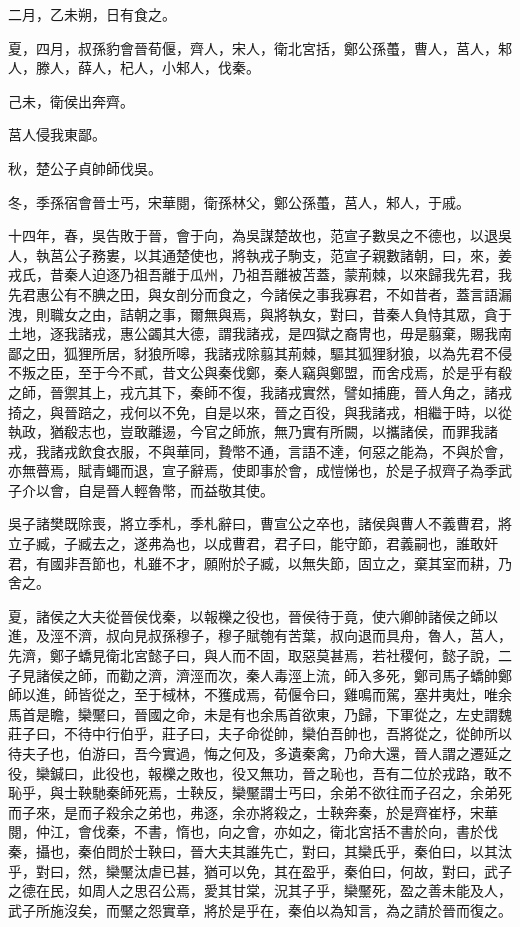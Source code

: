 \begin{pinyinscope}
二月，乙未朔，日有食之。

夏，四月，叔孫豹會晉荀偃，齊人，宋人，衛北宮括，鄭公孫蠆，曹人，莒人，邾人，滕人，薛人，杞人，小邾人，伐秦。

己未，衛侯出奔齊。

莒人侵我東鄙。

秋，楚公子貞帥師伐吳。

冬，季孫宿會晉士丐，宋華閱，衛孫林父，鄭公孫蠆，莒人，邾人，于戚。

十四年，春，吳告敗于晉，會于向，為吳謀楚故也，范宣子數吳之不德也，以退吳人，執莒公子務婁，以其通楚使也，將執戎子駒支，范宣子親數諸朝，曰，來，姜戎氏，昔秦人迫逐乃祖吾離于瓜州，乃祖吾離被苫蓋，蒙荊棘，以來歸我先君，我先君惠公有不腆之田，與女剖分而食之，今諸侯之事我寡君，不如昔者，蓋言語漏洩，則職女之由，詰朝之事，爾無與焉，與將執女，對曰，昔秦人負恃其眾，貪于土地，逐我諸戎，惠公蠲其大德，謂我諸戎，是四獄之裔冑也，毋是翦棄，賜我南鄙之田，狐狸所居，豺狼所嗥，我諸戎除翦其荊棘，驅其狐狸豺狼，以為先君不侵不叛之臣，至于今不貳，昔文公與秦伐鄭，秦人竊與鄭盟，而舍戍焉，於是乎有殽之師，晉禦其上，戎亢其下，秦師不復，我諸戎實然，譬如捕鹿，晉人角之，諸戎掎之，與晉踣之，戎何以不免，自是以來，晉之百役，與我諸戎，相繼于時，以從執政，猶殽志也，豈敢離逷，今官之師旅，無乃實有所闕，以攜諸侯，而罪我諸戎，我諸戎飲食衣服，不與華同，贄幣不通，言語不達，何惡之能為，不與於會，亦無瞢焉，賦青蠅而退，宣子辭焉，使即事於會，成愷悌也，於是子叔齊子為季武子介以會，自是晉人輕魯幣，而益敬其使。

吳子諸樊既除喪，將立季札，季札辭曰，曹宣公之卒也，諸侯與曹人不義曹君，將立子臧，子臧去之，遂弗為也，以成曹君，君子曰，能守節，君義嗣也，誰敢奸君，有國非吾節也，札雖不才，願附於子臧，以無失節，固立之，棄其室而耕，乃舍之。

夏，諸侯之大夫從晉侯伐秦，以報櫟之役也，晉侯待于竟，使六卿帥諸侯之師以進，及涇不濟，叔向見叔孫穆子，穆子賦匏有苦葉，叔向退而具舟，魯人，莒人，先濟，鄭子蟜見衛北宮懿子曰，與人而不固，取惡莫甚焉，若社稷何，懿子說，二子見諸侯之師，而勸之濟，濟涇而次，秦人毒涇上流，師入多死，鄭司馬子蟜帥鄭師以進，師皆從之，至于棫林，不獲成焉，荀偃令曰，雞鳴而駕，塞井夷灶，唯余馬首是瞻，欒黶曰，晉國之命，未是有也余馬首欲東，乃歸，下軍從之，左史謂魏莊子曰，不待中行伯乎，莊子曰，夫子命從帥，欒伯吾帥也，吾將從之，從帥所以待夫子也，伯游曰，吾今實過，悔之何及，多遺秦禽，乃命大還，晉人謂之遷延之役，欒鍼曰，此役也，報櫟之敗也，役又無功，晉之恥也，吾有二位於戎路，敢不恥乎，與士鞅馳秦師死焉，士鞅反，欒黶謂士丐曰，余弟不欲往而子召之，余弟死而子來，是而子殺余之弟也，弗逐，余亦將殺之，士鞅奔秦，於是齊崔杼，宋華閱，仲江，會伐秦，不書，惰也，向之會，亦如之，衛北宮括不書於向，書於伐秦，攝也，秦伯問於士鞅曰，晉大夫其誰先亡，對曰，其欒氏乎，秦伯曰，以其汰乎，對曰，然，欒黶汰虐已甚，猶可以免，其在盈乎，秦伯曰，何故，對曰，武子之德在民，如周人之思召公焉，愛其甘棠，況其子乎，欒黶死，盈之善未能及人，武子所施沒矣，而黶之怨實章，將於是乎在，秦伯以為知言，為之請於晉而復之。


\end{pinyinscope}
